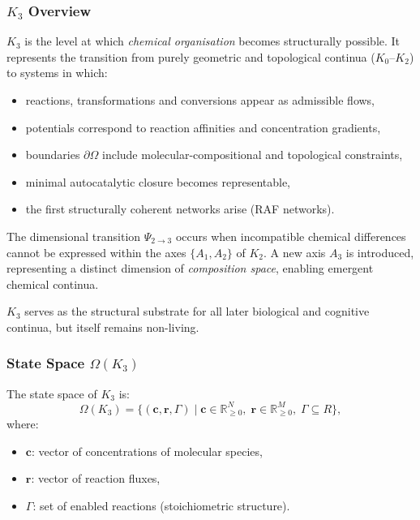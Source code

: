 

\subsubsection{\texorpdfstring{$K_3$}{K_3} Overview}
\label{sec:k3-overview}

$K_3$ is the level at which \emph{chemical organisation} becomes
structurally possible. It represents the transition from purely geometric
and topological continua ($K_0$--$K_2$) to systems in which:
\begin{itemize}
    \item reactions, transformations and conversions appear as admissible
          flows,
    \item potentials correspond to reaction affinities and concentration
          gradients,
    \item boundaries $\partial\Omega$ include molecular-compositional and
          topological constraints,
    \item minimal autocatalytic closure becomes representable,
    \item the first structurally coherent networks arise (RAF networks).
\end{itemize}

The dimensional transition $\Psi_{2\to3}$ occurs when incompatible
chemical differences cannot be expressed within the axes $\{A_1,A_2\}$ of
$K_2$. A new axis $A_3$ is introduced, representing a distinct dimension
of \emph{composition space}, enabling emergent chemical continua.

$K_3$ serves as the structural substrate for all later biological and
cognitive continua, but itself remains non-living.

\subsubsection{State Space \texorpdfstring{$\Omega(K_3)$}{\Omega(K_3)}}

The state space of $K_3$ is:
\[
\Omega(K_3) = \{ (\mathbf{c}, \mathbf{r}, \Gamma) \mid
\mathbf{c} \in \mathbb{R}_{\ge0}^N,\;
\mathbf{r} \in \mathbb{R}_{\ge0}^M,\;
\Gamma \subseteq R \},
\]
where:
\begin{itemize}
    \item $\mathbf{c}$: vector of concentrations of molecular species,
    \item $\mathbf{r}$: vector of reaction fluxes,
    \item $\Gamma$: set of enabled reactions (stoichiometric structure).
\end{itemize}

